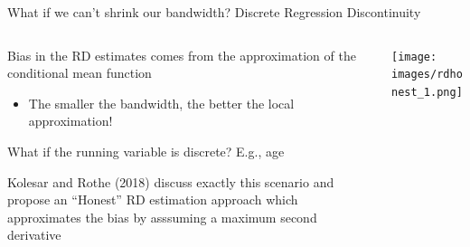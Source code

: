 \documentclass[notes,11pt, aspectratio=169]{beamer}
\newenvironment{wideitemize}{\itemize\addtolength{\itemsep}{10pt}}{\enditemize}
\begin{document}
\begin{frame}{What if we can't shrink our bandwidth? Discrete Regression Discontinuity}
    \begin{columns}[onlytextwidth, T] %
      \begin{column}{.6\textwidth}
        \begin{wideitemize}
        \item Bias in the RD estimates comes from the approximation of
          the conditional mean function
          \begin{itemize}
          \item The smaller the bandwidth, the better the local approximation!
          \end{itemize}
        \item What if the running variable is discrete? E.g., age
        \item Kolesar and Rothe (2018) discuss exactly this scenario
          and propose an ``Honest'' RD estimation approach which
          approximates the bias by asssuming a maximum second
          derivative
        \end{wideitemize}
      \end{column}%
      \hfill%
      \begin{column}{.4\textwidth}
        \texttt{[image: images/rdhonest\_1.png]}
      \end{column}%
    \end{columns}
\end{frame}
\end{document}
